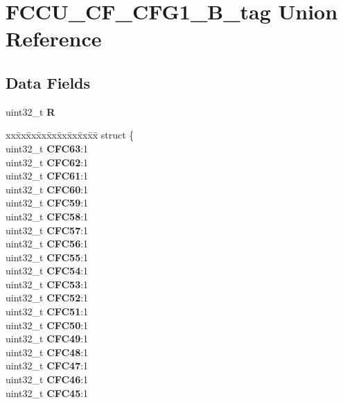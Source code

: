 \hypertarget{unionFCCU__CF__CFG1__32B__tag}{}\section{F\+C\+C\+U\+\_\+\+C\+F\+\_\+\+C\+F\+G1\+\_\+B\+\_\+tag Union Reference}
\label{unionFCCU__CF__CFG1__32B__tag}
\subsection*{Data Fields}
\begin{DoxyCompactItemize}
\item 
\mbox{\label{unionFCCU__CF__CFG1__32B__tag_a47bf2b61b8ab0f44bc6cc486bbbe8c8e}} 
uint32\+\_\+t {\bfseries R}
\item 
\mbox{\label{unionFCCU__CF__CFG1__32B__tag_ae21a4ebb60ebb20d6a7d2c22dc69852b}} 
\begin{tabbing}
xx\=xx\=xx\=xx\=xx\=xx\=xx\=xx\=xx\=\kill
struct \{\\
\>uint32\_t {\bfseries CFC63}:1\\
\>uint32\_t {\bfseries CFC62}:1\\
\>uint32\_t {\bfseries CFC61}:1\\
\>uint32\_t {\bfseries CFC60}:1\\
\>uint32\_t {\bfseries CFC59}:1\\
\>uint32\_t {\bfseries CFC58}:1\\
\>uint32\_t {\bfseries CFC57}:1\\
\>uint32\_t {\bfseries CFC56}:1\\
\>uint32\_t {\bfseries CFC55}:1\\
\>uint32\_t {\bfseries CFC54}:1\\
\>uint32\_t {\bfseries CFC53}:1\\
\>uint32\_t {\bfseries CFC52}:1\\
\>uint32\_t {\bfseries CFC51}:1\\
\>uint32\_t {\bfseries CFC50}:1\\
\>uint32\_t {\bfseries CFC49}:1\\
\>uint32\_t {\bfseries CFC48}:1\\
\>uint32\_t {\bfseries CFC47}:1\\
\>uint32\_t {\bfseries CFC46}:1\\
\>uint32\_t {\bfseries CFC45}:1\\

\end{tabbing}
\end{DoxyCompactItemize}
